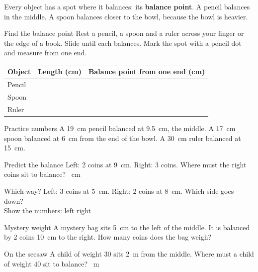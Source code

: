 \clearpage

Every object has a spot where it balances: its \textbf{balance point}. A pencil balances in the middle. A spoon balances closer to the bowl, because the bowl is heavier.

\begin{tryit}{Find the balance point}
Rest a pencil, a spoon and a ruler across your finger or the edge of a book. Slide until each balances. Mark the spot with a pencil dot and measure from one end.\par\medskip
\renewcommand{\arraystretch}{1.6}
\begin{tabular}{|l|c|c|}
\hline
\textbf{Object} & \textbf{Length (cm)} & \textbf{Balance point from one end (cm)} \\ \hline
Pencil & & \\ \hline
Spoon & & \\ \hline
Ruler & & \\ \hline
\end{tabular}
\end{tryit}

\begin{worked}{Practice numbers}
A 19~cm pencil balanced at 9.5~cm, the middle. A 17~cm spoon balanced at 6~cm from the end of the bowl. A 30~cm ruler balanced at 15~cm.
\end{worked}

\begin{puzzle}{Predict the balance}
Left: 2 coins at 9~cm. Right: 3 coins. Where must the right coins sit to balance? \wline[1.6cm]~cm
\end{puzzle}

\begin{puzzle}{Which way?}
Left: 3 coins at 5~cm. Right: 2 coins at 8~cm. Which side goes down? \wline[2cm]\\
Show the numbers: left \wline[1.4cm] right \wline[1.4cm]
\end{puzzle}

\begin{puzzle}{Mystery weight}
A mystery bag sits 5~cm to the left of the middle. It is balanced by 2 coins 10~cm to the right. How many coins does the bag weigh? \wline[1.6cm]
\end{puzzle}

\begin{puzzle}{On the seesaw}
A child of weight 30 sits 2~m from the middle. Where must a child of weight 40 sit to balance? \wline[1.6cm]~m
\end{puzzle}

